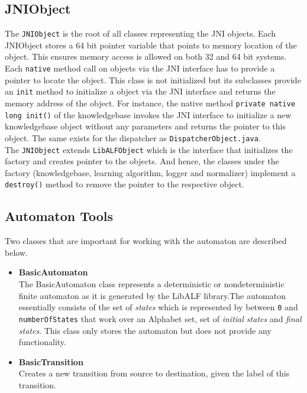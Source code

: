 \subsection{JNIObject}
The \texttt{JNIObject} is the root of all classes representing the JNI \libalf \cpp objects. Each JNIObject stores a 64 bit pointer variable that points to memory location of the \cpp object. This ensures memory access is allowed on both 32 and 64 bit systems. Each \texttt{native} method call on \cpp objects via the JNI interface has to provide a pointer to locate the object. This class is not initialized but its subclasses provide an \texttt{init} method to initialize a \cpp object via the JNI interface and returns the memory address of the object. For instance, the native method \texttt{private native long init()} of the knowledgebase invokes the JNI interface to initialize a new \cpp knowledgebase object without any parameters and returns the pointer to this object. The same exists for the dispatcher as \texttt{DispatcherObject.java}. \\
The \texttt{JNIObject} extends \texttt{LibALFObject} which is the interface that initializes the factory and creates pointer to the \cpp objects. And hence, the classes under the factory (knowledgebase, learning algorithm, logger and normalizer) implement a \texttt{destroy()} method to remove the pointer to the respective \cpp object. 

\subsection{Automaton Tools}
Two classes that are important for working with the automaton are described below.

\begin{itemize}
 \item \textbf{BasicAutomaton} \\
	      The BasicAutomaton class represents a deterministic or nondeterministic finite automaton as it is generated by the LibALF library.The automaton essentially consists of the set of \emph{states} which is represented by \integer between \texttt{0} and \texttt{numberOfStates} that work over an Alphabet set, set of \emph{initial states} and \emph{final states}. This class only stores the automaton but does not provide any functionality. 
 \item \textbf{BasicTransition} \\
	      Creates a new transition from source to destination, given the label of this transition.
\end{itemize}

